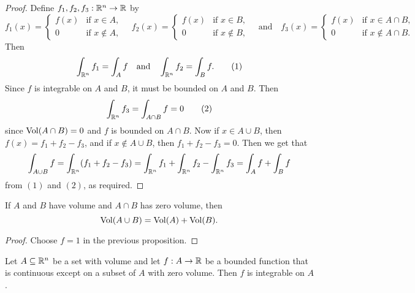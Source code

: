 \begin{proof}
  Define $f_1, f_2, f_3 : \mathbb{R}^n \to \mathbb{R}$ by
  \[
    f_1(x) = \begin{cases}
      f(x) & \text{if } x \in A, \\
      0 & \text{if } x \notin A,
    \end{cases}
    \quad
    f_2(x) = \begin{cases}
      f(x) & \text{if } x \in B, \\
      0 & \text{if } x \notin B,
    \end{cases}
    \quad \text{and} \quad
    f_3(x) = \begin{cases}
      f(x) & \text{if } x \in A \cap B, \\
      0 & \text{if } x \notin A \cap B.
    \end{cases}
  \]
  Then
  \[
    \int_{\mathbb{R}^n} f_1 = \int_A f
    \quad \text{and} \quad
    \int_{\mathbb{R}^n} f_2 = \int_B f. \tag{1}
  \]
  Since $f$ is integrable on $A$ and $B$, it must be
  bounded on $A$ and $B$. Then
  \[
    \int_{\mathbb{R}^n} f_3 = \int_{A \cap B} f = 0 \tag{2}
  \]
  since $\operatorname{Vol}(A \cap B) = 0$ and $f$ is bounded on
  $A \cap B$. Now if $x \in A \cup B$, then
  $f(x) = f_1 + f_2 - f_3$, and if
  $x \notin A \cup B$, then $f_1 + f_2 - f_3 = 0$.
  Then we get that
   \[
     \int_{A \cup B} f = \int_{\mathbb{R}^n} (f_1 + f_2 - f_3)
     = \int_{\mathbb{R}^n} f_1 + \int_{\mathbb{R}^n} f_2 - \int_{\mathbb{R}^n} f_3
     = \int_A f + \int_B f
  \]
  from $(1)$ and $(2)$, as required.
\end{proof}

\begin{corollary}
  If $A$ and $B$ have volume and $A \cap B$ has
  zero volume, then
  \[\operatorname{Vol}(A \cup B) = \operatorname{Vol}(A) + \operatorname{Vol}(B).\]
\end{corollary}

\begin{proof}
  Choose $f = 1$ in the previous proposition.
\end{proof}

\begin{theorem}
  Let $A \subseteq \mathbb{R}^n$ be a set with volume and
  let $f : A \to \mathbb{R}$ be a bounded function that is
  continuous except on a subset of $A$ with zero volume.
  Then $f$ is integrable on $A$.
\end{theorem}

